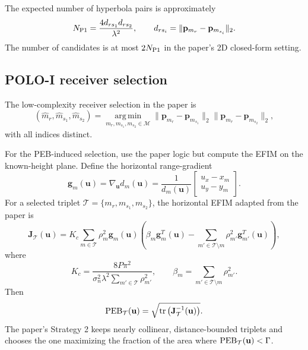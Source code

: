 \documentclass[11pt]{article}
\newcommand{\argmin}{\operatorname*{arg\,min}}
\newcommand{\tr}{\operatorname{tr}}
\begin{document}
The expected number of hyperbola pairs is approximately
\begin{equation}
    N_{\rm P1}=\frac{4d_{rs_1}d_{rs_2}}{\lambda^2},
    \qquad
    d_{rs_i}=\|\mathbf{p}_{m_r}-\mathbf{p}_{m_{s_i}}\|_2.
    \label{eq:polo_i_pair_count}
\end{equation}
The number of candidates is at most $2N_{\rm P1}$ in the paper's 2D closed-form setting.

\subsection{POLO-I receiver selection}

The low-complexity receiver selection in the paper is
\begin{equation}
    (\hat m_r,\hat m_{s_1},\hat m_{s_2})
    =\argmin_{m_r,m_{s_1},m_{s_2}\in\mathcal{M}}
    \|\mathbf{p}_{m_r}-\mathbf{p}_{m_{s_1}}\|_2
    \|\mathbf{p}_{m_r}-\mathbf{p}_{m_{s_2}}\|_2,
    \label{eq:polo_i_selection_low_complexity}
\end{equation}
with all indices distinct.

For the PEB-induced selection, use the paper logic but compute the EFIM on the known-height plane. Define the horizontal range-gradient
\begin{equation}
    \mathbf{g}_m(\mathbf{u})
    =\nabla_{\mathbf{u}} d_m(\mathbf{u})
    =\frac{1}{d_m(\mathbf{u})}
    \begin{bmatrix}u_x-x_m\\u_y-y_m\end{bmatrix}.
    \label{eq:horizontal_gradient}
\end{equation}
For a selected triplet $\mathcal{T}=\{m_r,m_{s_1},m_{s_2}\}$, the horizontal EFIM adapted from the paper is
\begin{equation}
    \mathbf{J}_{\mathcal{T}}(\mathbf{u})
    =K_c\sum_{m\in\mathcal{T}}\rho_m^2\mathbf{g}_m(\mathbf{u})
    \left(\beta_m\mathbf{g}_m^T(\mathbf{u})-
    \sum_{m'\in\mathcal{T}\setminus m}\rho_{m'}^2\mathbf{g}_{m'}^T(\mathbf{u})\right),
    \label{eq:polo_i_efim}
\end{equation}
where
\begin{equation}
    K_c=\frac{8P\pi^2}{\sigma_n^2\lambda^2\sum_{m'\in\mathcal{T}}\rho_{m'}^2},
    \qquad
    \beta_m=\sum_{m'\in\mathcal{T}\setminus m}\rho_{m'}^2.
\end{equation}
Then
\begin{equation}
    {\rm PEB}_{\mathcal{T}}(\mathbf{u})
    =\sqrt{\tr\left(\mathbf{J}_{\mathcal{T}}^{-1}(\mathbf{u})\right)}.
\end{equation}
The paper's Strategy 2 keeps nearly collinear, distance-bounded triplets and chooses the one maximizing the fraction of the area where ${\rm PEB}_{\mathcal{T}}(\mathbf{u})<\Gamma$.
\end{document}
